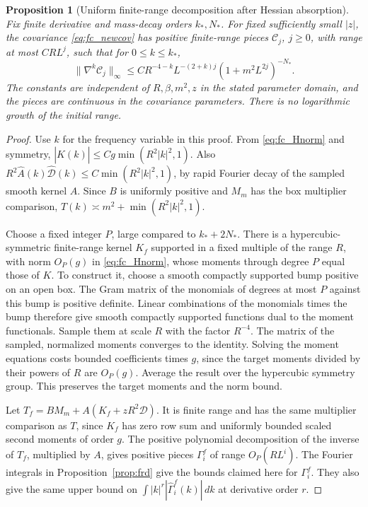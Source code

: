 \documentclass[11pt]{article}
\newtheorem{proposition}{Proposition}[section]
\begin{document}
\begin{proposition}[Uniform finite-range decomposition after Hessian absorption]\label{prop:fc_newcovbound}
Fix finite derivative and mass-decay orders \(k_*,N_*\). For fixed
sufficiently small \(|z|\), the covariance \eqref{eq:fc_newcov} has
positive finite-range pieces \(\mathscr C_j\), \(j\ge0\), with range
at most \(C R L^j\), such that for \(0\le k\le k_*\),
\[
 \|\nabla^k\mathscr C_j\|_\infty
 \le C R^{-4-k}L^{-(2+k)j}(1+m^2L^{2j})^{-N_*}.
\]
The constants are independent of \(R,\beta,m^2,z\) in the stated
parameter domain, and the pieces are continuous in the covariance
parameters. There is no logarithmic growth of the initial range.
\end{proposition}

\begin{proof}
Use \(k\) for the frequency variable in this proof. From
\eqref{eq:fc_Hnorm} and symmetry,
\(|\widehat K(k)|\le Cg\min(R^2|k|^2,1)\). Also
\(R^2\widehat A(k)\widehat{\mathcal D}(k)\le C\min(R^2|k|^2,1)\),
by rapid Fourier decay of the sampled smooth kernel \(A\).
Since \(B\) is uniformly positive and \(M_m\) has the box multiplier
comparison, \(\widehat T(k)\asymp m^2+\min(R^2|k|^2,1)\).

Choose a fixed integer \(P\), large compared to \(k_*+2N_*\).
There is a hypercubic-symmetric finite-range kernel \(K_f\) supported
in a fixed multiple of the range \(R\), with norm \(O_P(g)\) in
\eqref{eq:fc_Hnorm}, whose moments through degree \(P\) equal those
of \(K\). To construct it, choose a smooth compactly supported bump
positive on an open box. The Gram matrix of the monomials of degrees
at most \(P\) against this bump is positive definite. Linear combinations
of the monomials times the bump therefore give smooth compactly
supported functions dual to the moment functionals. Sample them at
scale \(R\) with the factor \(R^{-4}\). The matrix of the sampled,
normalized moments converges to the identity. Solving the moment
equations costs bounded coefficients times \(g\), since the target
moments divided by their powers of \(R\) are \(O_P(g)\).
Average the result over the hypercubic symmetry group. This preserves
the target moments and the norm bound.

Let \(T_f=BM_m+A(K_f+zR^2\mathcal D)\). It is finite range and has
the same multiplier comparison as \(T\), since \(K_f\) has zero row
sum and uniformly bounded scaled second moments of order \(g\).
The positive polynomial decomposition of the inverse of \(T_f\),
multiplied by \(A\), gives positive pieces \(\Gamma_i^f\) of range
\(O_P(RL^i)\). The Fourier integrals in Proposition~\ref{prop:frd}
give the bounds claimed here for \(\Gamma_i^f\). They also give the same upper bound on
\(\int |k|^r|\widehat\Gamma_i^f(k)|\,dk\) at derivative order \(r\).


\end{proof}
\end{document}

